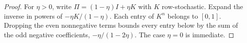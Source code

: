 \begin{proof}
For $\eta>0$, write $\Pi=(1-\eta)I+\eta K$ with $K$ row-stochastic.
Expand the inverse in powers of $-\eta K/(1-\eta)$. Each entry of
$K^n$ belongs to $[0,1]$. Dropping the even nonnegative terms bounds
every entry below by the sum of the odd negative coefficients,
$-\eta/(1-2\eta)$. The case $\eta=0$ is immediate.
\end{proof}

